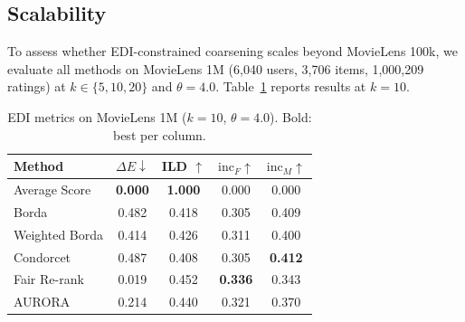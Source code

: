 \documentclass[runningheads]{llncs}
\begin{document}
\subsection{Scalability}
\label{sec:scalability}
To assess whether EDI-constrained coarsening scales beyond MovieLens
100k, we evaluate all methods on MovieLens 1M (6,040 users, 3,706
items, 1,000,209 ratings) at $k \in \{5, 10, 20\}$ and $\theta = 4.0$.
Table~\ref{tab:1m} reports results at $k = 10$.
\begin{table}[h!]
\caption{EDI metrics on MovieLens 1M ($k=10$, $\theta=4.0$).
Bold: best per column.}
\label{tab:1m}
\centering
\begin{tabular}{lcccc}
\hline
Method & $\Delta E \downarrow$ & ILD $\uparrow$ &
$\mathrm{inc}_F \uparrow$ & $\mathrm{inc}_M \uparrow$ \\
\hline
Average Score  & \textbf{0.000} & \textbf{1.000} & 0.000 & 0.000 \\
Borda          & 0.482 & 0.418 & 0.305 & 0.409 \\
Weighted Borda & 0.414 & 0.426 & 0.311 & 0.400 \\
Condorcet      & 0.487 & 0.408 & 0.305 & \textbf{0.412} \\
Fair Re-rank   & 0.019 & 0.452 & \textbf{0.336} & 0.343 \\
AURORA           & 0.214 & 0.440 & 0.321 & 0.370 \\
\hline
\end{tabular}
\end{table}
\end{document}
